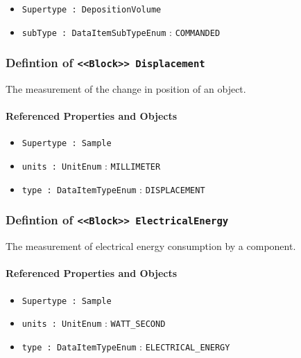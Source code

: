 \begin{itemize}
\item \texttt{Supertype : DepositionVolume}

\item \texttt{subType : DataItemSubTypeEnum} : \texttt{COMMANDED}

\end{itemize}
\FloatBarrier
\subsubsection{Defintion of \texttt{<<Block>> Displacement}}
  \label{type:Displacement}

\FloatBarrier

The measurement of the change in position of an object.

\FloatBarrier
\paragraph{Referenced Properties and Objects}

\begin{itemize}
\item \texttt{Supertype : Sample}

\item \texttt{units : UnitEnum} : \texttt{MILLIMETER}

\item \texttt{type : DataItemTypeEnum} : \texttt{DISPLACEMENT}

\end{itemize}
\FloatBarrier
\subsubsection{Defintion of \texttt{<<Block>> ElectricalEnergy}}
  \label{type:ElectricalEnergy}

\FloatBarrier

The measurement of electrical energy consumption by a component.

\FloatBarrier
\paragraph{Referenced Properties and Objects}

\begin{itemize}
\item \texttt{Supertype : Sample}

\item \texttt{units : UnitEnum} : \texttt{WATT_SECOND}

\item \texttt{type : DataItemTypeEnum} : \texttt{ELECTRICAL_ENERGY}

\end{itemize}
\FloatBarrier
